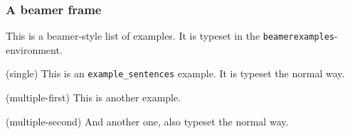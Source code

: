 \documentclass{article}
\begin{document}
	\begin{frame}
		\frametitle{A beamer frame}
		\begin{beamerexamples}
			This is a beamer-style list of examples.  It is typeset in the \texttt{beamerexamples}-environment.
		\end{beamerexamples}
		
		\begin{examples}
			\item(single) This is an \texttt{example\_sentences} example. It is typeset the normal way.
		\end{examples}
		\begin{examples}
		 	 \item(multiple-first) This is another example.
		 	 \item(multiple-second) And another one, also typeset the normal way.
		\end{examples}
	\end{frame}
\end{document}
